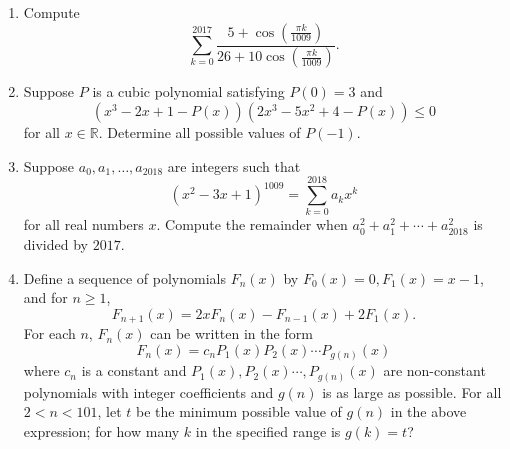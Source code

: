 \documentclass[10pt]{article}
\begin{document}
\begin{enumerate}
\item Compute
\[\sum_{k=0}^{2017}\dfrac{5+\cos\left(\frac{\pi k}{1009}\right)}{26+10\cos\left(\frac{\pi k}{1009}\right)}.\]

\item Suppose $P$ is a cubic polynomial satisfying $P(0) = 3$ and \[(x^3 - 2x + 1 - P(x))(2x^3 - 5x^2 + 4 - P(x))\leq 0\] for all $x\in\mathbb R$.  Determine all possible values of $P(-1)$.

\item Suppose $a_0,a_1,\ldots, a_{2018}$ are integers such that \[(x^2-3x+1)^{1009} = \sum_{k=0}^{2018}a_kx^k\] for all real numbers $x$.  Compute the remainder when $a_0^2 + a_1^2 + \cdots + a_{2018}^2$ is divided by $2017$.

\item Define a sequence of polynomials $F_n(x)$ by $F_0(x)=0, F_1(x)=x-1$, and for $n\geq 1$, $$F_{n+1}(x)=2xF_n(x)-F_{n-1}(x)+2F_1(x).$$ For each $n$, $F_n(x)$ can be written in the form $$F_n(x)=c_nP_1(x)P_2(x)\cdots P_{g(n)}(x)$$ where $c_n$ is a constant and $P_1(x),P_2(x)\cdots, P_{g(n)}(x)$ are non-constant polynomials with integer coefficients and $g(n)$ is as large as possible. For all $2< n< 101$, let $t$ be the minimum possible value of $g(n)$ in the above expression; for how many $k$ in the specified range is $g(k)=t$?

\end{enumerate}
\end{document}
